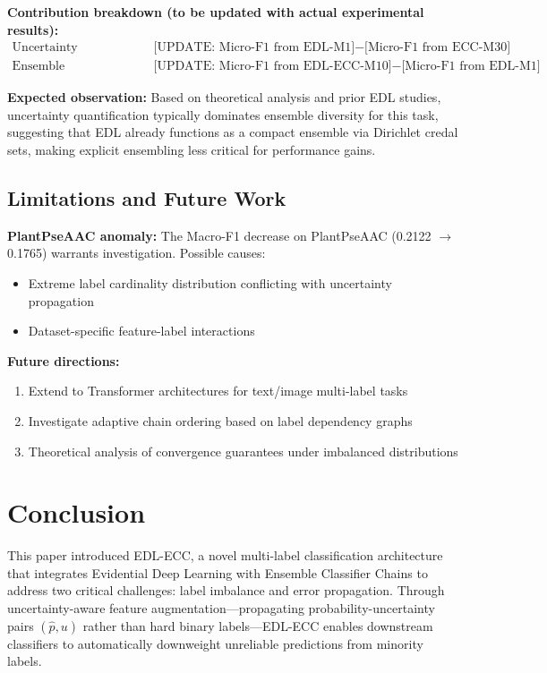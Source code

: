 \documentclass[conference]{IEEEtran}
\begin{document}
\textbf{Contribution breakdown (to be updated with actual experimental results):}
\begin{align}
\text{Uncertainty contribution:} &\quad \text{[UPDATE: Micro-F1 from EDL-M1]} - \text{[Micro-F1 from ECC-M30]} \\
\text{Ensemble contribution:} &\quad \text{[UPDATE: Micro-F1 from EDL-ECC-M10]} - \text{[Micro-F1 from EDL-M1]}
\end{align}

\textbf{Expected observation:} Based on theoretical analysis and prior EDL studies, uncertainty quantification typically dominates ensemble diversity for this task, suggesting that EDL already functions as a compact ensemble via Dirichlet credal sets, making explicit ensembling less critical for performance gains.

\subsection{Limitations and Future Work}

\textbf{PlantPseAAC anomaly:} The Macro-F1 decrease on PlantPseAAC (0.2122 $\to$ 0.1765) warrants investigation. Possible causes:
\begin{itemize}
    \item Extreme label cardinality distribution conflicting with uncertainty propagation
    \item Dataset-specific feature-label interactions
\end{itemize}

\textbf{Future directions:}
\begin{enumerate}
    \item Extend to Transformer architectures for text/image multi-label tasks
    \item Investigate adaptive chain ordering based on label dependency graphs
    \item Theoretical analysis of convergence guarantees under imbalanced distributions
\end{enumerate}

\section{Conclusion}

This paper introduced EDL-ECC, a novel multi-label classification architecture that integrates Evidential Deep Learning with Ensemble Classifier Chains to address two critical challenges: label imbalance and error propagation. Through uncertainty-aware feature augmentation—propagating probability-uncertainty pairs $(\hat{p}, u)$ rather than hard binary labels—EDL-ECC enables downstream classifiers to automatically downweight unreliable predictions from minority labels.
\end{document}
